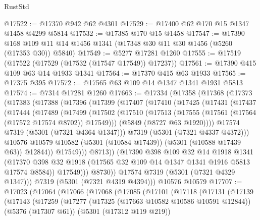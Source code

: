 \begin{lexlean}{RustStd}
\begin{coremodule}
@17522 := @17370 @942 @62 @4301
@17529 := @17400 @62 @170 @15 @1347 @1458 @4299 @5814
@17532 := @17385 @170 @15 @1458
@17547 := @17390 @168 @109 @11 @14 @1456 @1341 (@17348 @30 @11 @30 @1456 (@5260 (@17353 @30)) @5840)
@17549 := @5277 @17281 @1260
@17555 := @17519 (@17522 (@17529 (@17532 (@17547 @17549)) @17237))
@17561 := @17390 @415 @109 @63 @14 @1933 @1341
@17564 := @17370 @415 @63 @1933
@17565 := @17375 @395
@17572 := @17565 @63 @109 @14 @1347 @1341 @1931 @5813
@17574 := @7314 @17281 @1260
@17663 := @17334
    (@17358
      (@17368
        (@17373
          (@17383
            (@17388
              (@17396
                (@17399
                  (@17407
                    (@17410
                      (@17425
                        (@17431
                          (@17437
                            (@17444
                              (@17489
                                (@17499
                                  (@17502
                                    (@17510
                                      (@17513
                                        (@17555 (@17561 (@17564 (@17572 @17574 @8702)) @17549)))
                                      (@5849 (@8727 @63 @1920))))
                                  @17574
                                  @7319
                                  (@5301 (@7321 @4364 @1347)))
                                @7319
                                (@5301 (@7321 @4337 @4372)))
                              @10576
                              @10579
                              @10582
                              (@5301 (@10584 @17439))
                              (@5301 (@10588 @17439 @63))
                              @12844))
                          @17549)))
                    @8713))
                (@17390
                  @398
                  @109
                  @32
                  @14
                  @1918
                  @1341
                  (@17370 @398 @32 @1918 (@17565 @32 @109 @14 @1347 @1341 @1916 @5813 @17574 @8584))
                  @17549)))
            @8730))
        @17574
        @7319
        (@5301 (@7321 @4329 @1347)))
      @7319
      (@5301 (@7321 @4319 @4394)))
    @10576
    @10579
@17707 := @17023
    (@17064
      (@17066
        (@17068
          (@17085
            (@17101
              (@17118
                (@17131
                  (@17139
                    (@17143
                      (@17259
                        (@17277
                          (@17325 (@17663 @10582 @10586 @10591 @12844))
                          (@5376 (@17307 @61))
                          (@5301 (@17312 @119 @219))

\end{coremodule}
\end{lexlean}
